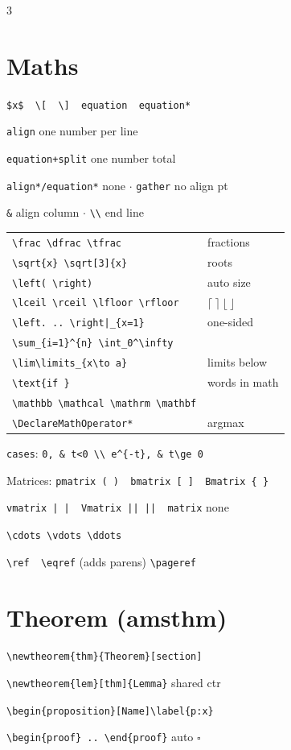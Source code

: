 \documentclass[a4paper]{article}
\makeatletter
\newcommand{\C}[1]{\texttt{\footnotesize #1}}
\newenvironment{rows}{\vspace{1pt}\begin{tabular}{@{}>{\raggedright\arraybackslash}p{3.35cm}@{}>{\raggedright\arraybackslash}p{2.4cm}@{}}}{\end{tabular}\vspace{2pt}\par}
\newcommand{\R}[2]{\C{#1} & #2 \\}
\makeatother
\begin{document}
{\begin{multicols}{3}
\section{Maths}
\C{\$x\$ \ \textbackslash[ \ \textbackslash] \ equation \ equation*}\par
\C{align} one number per line\par
\C{equation+split} one number total\par
\C{align*/equation*} none $\cdot$ \C{gather} no align pt\par
\C{\&} align column $\cdot$ \C{\textbackslash\textbackslash} end line\par
\begin{rows}
\R{\textbackslash frac \textbackslash dfrac \textbackslash tfrac}{fractions}
\R{\textbackslash sqrt\{x\} \textbackslash sqrt[3]\{x\}}{roots}
\R{\textbackslash left( \textbackslash right)}{auto size}
\R{\textbackslash lceil \textbackslash rceil \textbackslash lfloor \textbackslash rfloor}{$\lceil\ \rceil\ \lfloor\ \rfloor$}
\R{\textbackslash left. .. \textbackslash right|\_\{x=1\}}{one-sided}
\R{\textbackslash sum\_\{i=1\}\^{}\{n\} \textbackslash int\_0\^{}\textbackslash infty}{}
\R{\textbackslash lim\textbackslash limits\_\{x\textbackslash to a\}}{limits below}
\R{\textbackslash text\{if \}}{words in math}
\R{\textbackslash mathbb \textbackslash mathcal \textbackslash mathrm \textbackslash mathbf}{}
\R{\textbackslash DeclareMathOperator*}{argmax}
\end{rows}
\C{cases}: \C{0, \& t<0 \textbackslash\textbackslash \ e\^{}\{-t\}, \& t\textbackslash ge 0}\par
Matrices: \C{pmatrix ( ) \ bmatrix [ ] \ Bmatrix \{ \}}\par
\C{vmatrix | | \ Vmatrix || || \ matrix} none\par
\C{\textbackslash cdots \textbackslash vdots \textbackslash ddots}\par
\C{\textbackslash ref \ \textbackslash eqref} (adds parens) \C{\textbackslash pageref}

\section{Theorem (amsthm)}
\C{\textbackslash newtheorem\{thm\}\{Theorem\}[section]}\par
\C{\textbackslash newtheorem\{lem\}[thm]\{Lemma\}} shared ctr\par
\C{\textbackslash begin\{proposition\}[Name]\textbackslash label\{p:x\}}\par
\C{\textbackslash begin\{proof\} .. \textbackslash end\{proof\}} auto $\square$


\end{multicols}}
\end{document}
